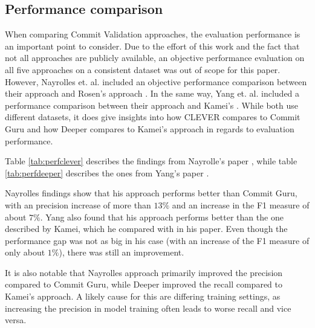 \subsection{Performance comparison}

When comparing Commit Validation approaches, the evaluation performance is an important point to consider. Due to the effort of this work and the fact that not all approaches are publicly available, an objective performance evaluation on all five approaches on a consistent dataset was out of scope for this paper. However, Nayrolles et. al. included an objective performance comparison between their approach and Rosen's approach \cite{Nayrolles2018}. In the same 
way, %
Yang et. al. included a performance comparison between their approach and Kamei's \cite{Yang2015}. While both use different datasets, it does give insights into how CLEVER compares to Commit Guru and how Deeper compares to Kamei's approach in regards to evaluation performance.

Table \ref{tab:perfclever} describes the findings from Nayrolle's paper \cite{Nayrolles2018}, while table \ref{tab:perfdeeper} describes the ones from Yang's paper \cite{Yang2015}.

Nayrolles findings show that his approach performs better than Commit Guru, with an precision increase of more than $13\%$ and an increase in the F1 measure of about $7\%$. Yang also found that his approach performs better than the one described by Kamei, which he compared with in his paper. Even though the performance gap was not as big in his case (with an increase of the F1 measure of only about $1\%$), there was still an improvement. 

It is also notable that Nayrolles approach primarily improved the precision compared to Commit Guru, while Deeper improved the recall compared to Kamei's approach. A likely cause for this are differing training settings, as increasing the precision in model training often leads to worse recall and vice versa. 


